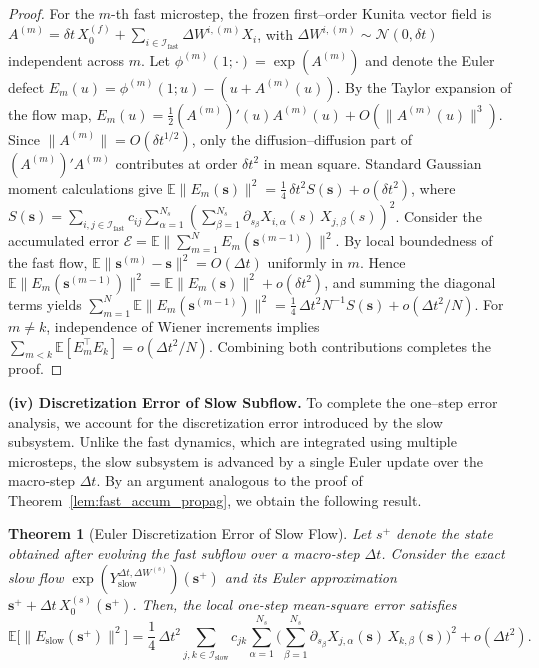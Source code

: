\documentclass{article}
\newtheorem{theorem}{Theorem}
\begin{document}
\begin{proof}
For the $m$-th fast microstep, the frozen first--order Kunita vector field is
$A^{(m)}=\delta t\,X_0^{(f)}+\sum_{i\in\mathcal I_{\mathrm{fast}}}\Delta W^{i,(m)}X_i$,
with $\Delta W^{i,(m)}\sim\mathcal N(0,\delta t)$ independent across $m$.
Let $\phi^{(m)}(1;\cdot)=\exp(A^{(m)})$ and denote the Euler defect
$E_m(u)=\phi^{(m)}(1;u)-(u+A^{(m)}(u))$. By the Taylor expansion of the flow map,
$E_m(u)=\tfrac12(A^{(m)})'(u)A^{(m)}(u)+O(\|A^{(m)}(u)\|^3)$.
Since $\|A^{(m)}\|=O(\delta t^{1/2})$, only the diffusion--diffusion part of
$(A^{(m)})'A^{(m)}$ contributes at order $\delta t^2$ in mean square.
Standard Gaussian moment
calculations give
$\mathbb E\|E_m(\pmb{s})\|^2=\tfrac14\,\delta t^2 S(\pmb{s})+o(\delta t^2)$,
where $S(\pmb{s})=\sum_{i,j\in \mathcal I_{\mathrm{fast}}} c_{ij}
\sum_{\alpha=1}^{N_s}
\left(
   \sum_{\beta=1}^{N_s}
      \partial_{s_\beta}X_{i,\alpha}(s)\,X_{j,\beta}(s)
\right)^{\!2}$. Consider the accumulated error
$\mathcal E=\mathbb E\|\sum_{m=1}^N E_m(\pmb{s}^{(m-1)})\|^2$.
By local boundedness of the fast flow,
$\mathbb E\|\pmb{s}^{(m)}-\pmb{s}\|^2=O(\Delta t)$ uniformly in $m$.
Hence
$\mathbb E\|E_m(\pmb{s}^{(m-1)})\|^2
=\mathbb E\|E_m(\pmb{s})\|^2+o(\delta t^2)$,
and summing the diagonal terms yields
$\sum_{m=1}^N\mathbb E\|E_m(\pmb{s}^{(m-1)})\|^2
=\tfrac14\,\Delta t^2 N^{-1} S(\pmb{s})+o(\Delta t^2/N)$. For $m\neq k$, independence of Wiener increments implies
$\sum_{m<k}\mathbb E[E_m^\top E_k]=o(\Delta t^2/N)$.
Combining both contributions completes the proof.
\end{proof}

\textbf{(iv) Discretization Error of Slow Subflow.}
To complete the one--step error analysis, we account for the discretization error introduced by the slow subsystem.
Unlike the fast dynamics, which are integrated using multiple microsteps, the slow subsystem is advanced by a single Euler update over the macro‑step
$\Delta t$. By an argument analogous to the proof of Theorem~\ref{lem:fast_accum_propag}, we obtain the following result.


\begin{theorem}[Euler Discretization Error of Slow Flow]
\label{lem:slow_ODE_simple}
Let $s^{+}$ denote the state obtained after evolving the fast subflow over a macro‑step $\Delta t$.
Consider the exact slow flow 
$\exp(Y_{\mathrm{slow}}^{\Delta t,\Delta W^{(s)}})(\pmb{s}^{+})$
and its Euler approximation 
$\pmb{s}^{+} + \Delta t\,X_0^{(s)}(\pmb{s}^{+})$.
Then, the local one‑step mean‑square error satisfies
\begin{equation}
\label{eq:slow_ODE_error_simple}
\mathbb E\!\big[\|E_{\mathrm{slow}}(\pmb{s}^{+})\|^2\big]
=
\frac14\,\Delta t^2
\sum_{j,k\in \mathcal{I}_{\mathrm{slow}}} c_{jk}
\sum_{\alpha=1}^{N_s}
\Big(
   \sum_{\beta=1}^{N_s}
      \partial_{s_\beta}X_{j,\alpha}(\pmb{s})\,X_{k,\beta}(\pmb{s})
\Big)^{\!2}
+ o(\Delta t^2).
\end{equation}
\end{theorem}
\end{document}
